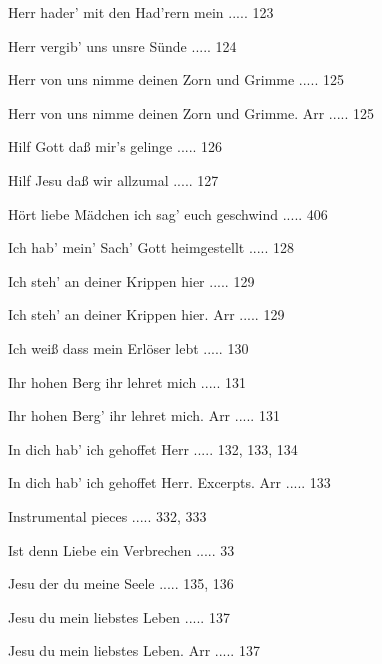 \documentclass[twocolumn]{book}
\begin{document}
\newline 
Herr hader' mit den Had'rern mein ..... 123

\newline 
Herr vergib' uns unsre Sünde ..... 124

\newline 
Herr von uns nimme deinen Zorn und Grimme ..... 125

\newline 
Herr von uns nimme deinen Zorn und Grimme. Arr ..... 125

\newline 
Hilf Gott daß mir's gelinge ..... 126

\newline 
Hilf Jesu daß wir allzumal ..... 127

\newline 
Hört liebe Mädchen ich sag' euch geschwind ..... 406

\newline 
Ich hab' mein' Sach' Gott heimgestellt ..... 128

\newline 
Ich steh' an deiner Krippen hier ..... 129

\newline 
Ich steh' an deiner Krippen hier. Arr ..... 129

\newline 
Ich weiß dass mein Erlöser lebt ..... 130

\newline 
Ihr hohen Berg ihr lehret mich ..... 131

\newline 
Ihr hohen Berg' ihr lehret mich. Arr ..... 131

\newline 
In dich hab' ich gehoffet Herr ..... 132, 133, 134

\newline 
In dich hab' ich gehoffet Herr. Excerpts. Arr ..... 133

\newline 
Instrumental pieces ..... 332, 333

\newline 
Ist denn Liebe ein Verbrechen ..... 33

\newline 
Jesu der du meine Seele ..... 135, 136

\newline 
Jesu du mein liebstes Leben ..... 137

\newline 
Jesu du mein liebstes Leben. Arr ..... 137
\end{document}
